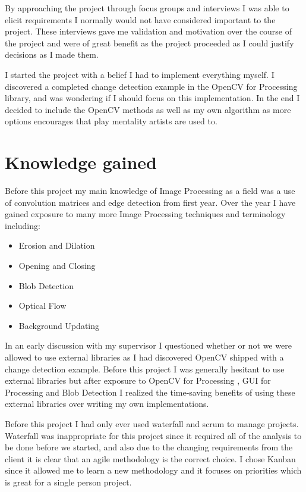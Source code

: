 \documentclass[a4paper]{report}
\begin{document}
By approaching the project through focus groups and interviews I was able to elicit requirements I normally would not have considered important to the project. These interviews gave me validation and motivation over the course of the project and were of great benefit as the project proceeded as I could justify decisions as I made them.

I started the project with a belief I had to implement everything myself. I discovered a completed change detection example in the OpenCV for Processing \cite{OPENCV} library, and was wondering if I should focus on this implementation. In the end I decided to include the OpenCV methods as well as my own algorithm as more options encourages that play mentality artists are used to.

\section{Knowledge gained}
Before this project my main knowledge of Image Processing as a field was a use of convolution matrices and edge detection from first year. Over the year I have gained exposure to many more Image Processing techniques and terminology including:

\begin{itemize}
\item Erosion and Dilation
\item Opening and Closing
\item Blob Detection
\item Optical Flow
\item Background Updating
\end{itemize}

In an early discussion with my supervisor I questioned whether or not we were allowed to use external libraries as I had discovered OpenCV shipped with a change detection example. Before this project I was generally hesitant to use external libraries but after exposure to OpenCV for Processing \cite{PROCESSING}, GUI for Processing \cite{G4P} and Blob Detection \cite{BLOB} I realized the time-saving benefits of using these external libraries over writing my own implementations.

Before this project I had only ever used waterfall and scrum to manage projects. Waterfall was inappropriate for this project since it required all of the analysis to be done before we started, and also due to the changing requirements from the client it is clear that an agile methodology is the correct choice. I chose Kanban since it allowed me to learn a new methodology and it focuses on priorities which is great for a single person project.
\end{document}
